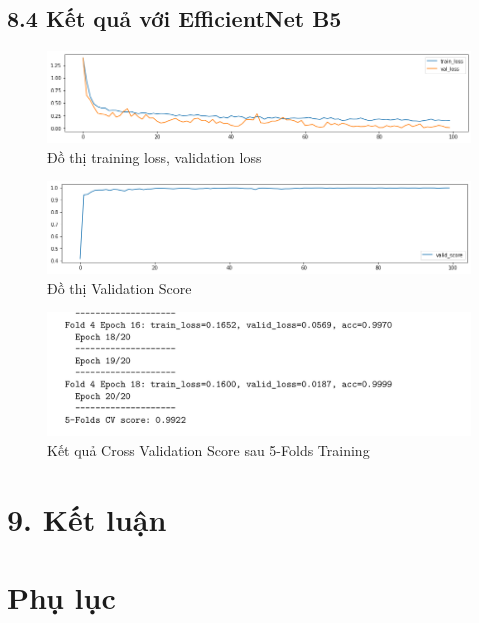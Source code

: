 \documentclass{article}
\begin{document}
	\subsection{8.4 Kết quả với EfficientNet B5}
	\begin{figure}[H]
		\centering
		\includegraphics[width=1\linewidth]{results/efficientnet-b5/training_loss_results.png}
		\caption{Đồ thị training loss, validation loss}
		\label{fig:writing-thesis}
	\end{figure}
	\begin{figure}[H]
		\centering
		\includegraphics[width=1\linewidth]{results/efficientnet-b5/valid_score_results.png}
		\caption{Đồ thị Validation Score}
		\label{fig:writing-thesis}
	\end{figure}
	\begin{figure}[H]
		\centering
		\includegraphics[width=1\linewidth]{results/efficientnet-b5/CV_Score_5_Folds_EfficientNetB5.png}
		\caption{Kết quả Cross Validation Score sau 5-Folds Training}
		\label{fig:writing-thesis}
	\end{figure}
	\section{9. Kết luận}
	
	\section{Phụ lục}
	
\end{document}
